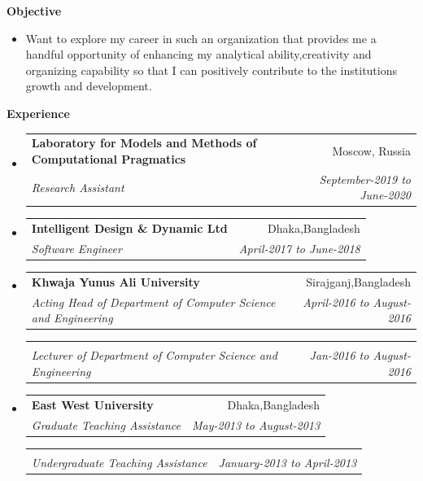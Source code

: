 \documentclass[letterpaper,10pt]{article}
\makeatletter
\newcommand{\resitem}[1]{\item #1 \vspace{-2pt}}
\newcommand{\resheading}[1]{{\large \colorbox{mygrey}{\begin{minipage}{\textwidth}{\textbf{#1 \vphantom{p\^{E}}}}\end{minipage}}}}
\newcommand{\ressubheading}[4]{
\begin{tabular*}{6.5in}{l@{\extracolsep{\fill}}r}
		\textbf{#1} & #2 \\
		\textit{#3} & \textit{#4} \\
\end{tabular*}\vspace{-6pt}}
\makeatother
\begin{document}
\vspace{0.1in}

\resheading{Objective}
\begin{itemize}
\resitem{ \justify
 Want to explore my career in such an organization that provides me a handful opportunity of enhancing my analytical ability,creativity and organizing capability so that I can positively contribute to the institutions growth and development.


 }
\end{itemize}

\vspace{0.1in}
\resheading{Experience}
\begin{itemize}


\item

\ressubheading{Laboratory for Models and Methods of Computational Pragmatics}{Moscow, Russia}{Research Assistant}{September-2019 to June-2020}

\item

\ressubheading{Intelligent Design \& Dynamic Ltd}{Dhaka,Bangladesh}{Software Engineer}{April-2017 to June-2018}
\item
\ressubheading{Khwaja Yunus Ali University}{Sirajganj,Bangladesh}{Acting Head of Department of Computer Science and Engineering}{April-2016 to August-2016}
\ressubheading{ }{}{Lecturer of Department of Computer Science and Engineering}{Jan-2016 to August-2016 }
\item
	\ressubheading{East West University}{Dhaka,Bangladesh}{Graduate Teaching Assistance }{May-2013 to August-2013 }
\ressubheading{}{}{Undergraduate Teaching Assistance}{January-2013 to April-2013}	
\end{itemize}
\end{document}
